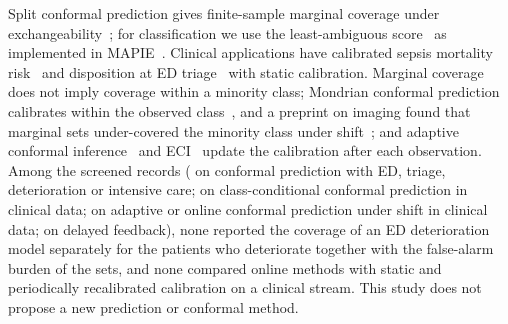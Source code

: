 Split conformal prediction gives finite-sample marginal coverage under exchangeability~\cite{lei2018distributionfree,vovk2022algorithmic}; for classification we use the
least-ambiguous score~\cite{sadinle2019lac} as implemented in MAPIE~\cite{cordier2023mapie}. Clinical applications have calibrated sepsis mortality
risk~\cite{yang2024sepsisconformal} and disposition at ED triage~\cite{abdulai2025idontknow} with static calibration. Marginal coverage does not imply coverage within a minority class; Mondrian conformal prediction calibrates within the observed class~\cite{vovk2003mondrian,ding2023classconditional}, and a preprint on imaging found that marginal sets under-covered the minority class under shift~\cite{millar2026classconditionalms}; and adaptive conformal inference~\cite{gibbs2021aci} and ECI~\cite{wu2025eci} update the calibration after each observation. Among the screened records (\RVLitHitsTwo{} on conformal prediction
with ED, triage, deterioration or intensive care; \RVLitHitsThree{} on class-conditional conformal prediction in clinical data; \RVLitHitsFour{} on adaptive or online
conformal prediction under shift in clinical data; \RVLitHitsFive{} on delayed feedback), none reported the coverage of an ED deterioration model separately for the
patients who deteriorate together with the false-alarm burden of the sets, and none compared online methods with static and periodically recalibrated calibration on a
clinical stream. This study does not propose a new prediction or conformal method.
